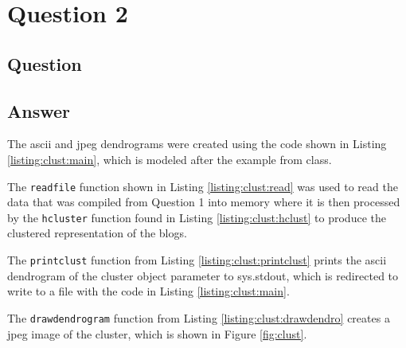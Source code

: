 \section{Question 2}

\subsection{Question}


\subsection{Answer}
The ascii and jpeg dendrograms were created using the code shown in Listing \ref{listing:clust:main}, which is modeled after the example from class. 



The {\tt readfile} function shown in Listing \ref{listing:clust:read} was used to read the data that was compiled from Question 1 into memory where it is then processed by the {\tt hcluster} function found in Listing \ref{listing:clust:hclust} to produce the clustered representation of the blogs.





The {\tt printclust} function from Listing \ref{listing:clust:printclust} prints the ascii dendrogram of the cluster object parameter to sys.stdout, which is redirected to write to a file with the code in Listing \ref{listing:clust:main}.



The {\tt drawdendrogram} function from Listing \ref{listing:clust:drawdendro} creates a jpeg image of the cluster, which is shown in Figure \ref{fig:clust}.



